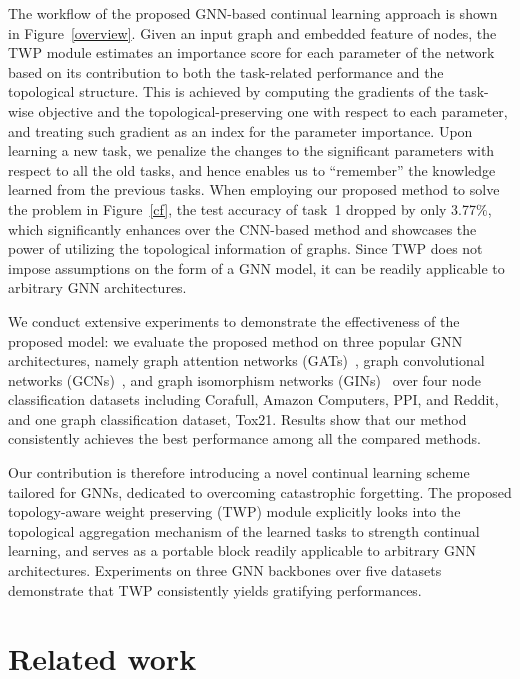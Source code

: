 \documentclass[letterpaper]{article} %
\begin{document}
The workflow of the proposed GNN-based
continual learning approach is shown in Figure~\ref{overview}.
Given an input graph and embedded feature of nodes,
the TWP module estimates an importance score for each
parameter of the network based on its contribution
to both the task-related performance and the topological structure.
This is achieved by computing the
gradients of the task-wise objective and
the topological-preserving one
with respect to each parameter,
and treating such gradient as
an index for the parameter importance.
Upon learning a new task, we penalize
the changes to the significant parameters
with respect to all the old tasks,
and hence enables us to ``remember'' the knowledge
learned from the previous tasks.
{When employing our proposed method to
solve the problem in
Figure~\ref{cf}, the test accuracy of task~1 dropped by
only 3.77$\%$, which significantly enhances over the CNN-based method and
showcases the power of utilizing the
topological information of graphs.}
Since TWP does not impose assumptions on the
form of a GNN model,
it can be readily applicable to arbitrary GNN
architectures.

We conduct extensive experiments to
demonstrate the effectiveness
of the proposed model:
we evaluate the proposed method
on three popular GNN architectures,
namely {graph attention networks (GATs)~\cite{velivckovic2017graph}, graph convolutional networks (GCNs)~\cite{kipf2016semi}, and graph isomorphism networks (GINs)~\cite{xu2018powerful}}
over  four node classification datasets including
Corafull, Amazon Computers, PPI, and Reddit,
and one graph classification dataset, Tox21.
Results show that our method consistently achieves
the best performance among all the compared methods.

Our contribution is therefore
introducing a novel
continual learning scheme tailored
for GNNs, dedicated to overcoming
catastrophic forgetting.
The proposed topology-aware weight preserving (TWP) module
explicitly looks into the topological
aggregation mechanism of the learned tasks
to strength continual learning,
and serves as a portable block
readily applicable to arbitrary GNN architectures.
Experiments on three GNN backbones over five datasets
demonstrate that TWP consistently yields
gratifying performances.





\section{Related work}
\end{document}
